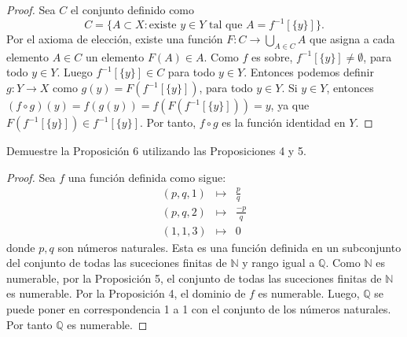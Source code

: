 \documentclass[12pt]{article}
\newcommand{\N}{\mathbb{N}}
\newcommand{\Q}{\mathbb{Q}}
\newenvironment{problem}[2][Problema]{\begin{trivlist}
\item[\hskip \labelsep {\bfseries #1}\hskip \labelsep {\bfseries #2.}]}{\end{trivlist}}
\begin{document}
\begin{proof}
Sea $C$ el conjunto definido como $$C = \{A \subset X: \text{existe } y \in Y \text{ tal que } A = f^{-1}[\{y\}] \}. $$
Por el axioma de elección, existe una función $F: C \rightarrow \bigcup_{A \in C} A$ que asigna a cada elemento $A \in C$ un elemento $F(A) \in A$. Como $f$ es sobre, $f^{-1}[\{y\}] \neq \emptyset$, para todo $y \in Y$. Luego  $f^{-1}[\{y\}]\in C$ para todo $y \in Y$. Entonces podemos definir $g: Y \rightarrow X$ como $g(y) = F(f^{-1}[\{y\}]) $, para todo $y \in Y.$ Si $y \in Y$, entonces $(f \circ g)(y) = f(g(y)) = f(F(f^{-1}[\{y\}])) = y $, ya que $F(f^{-1}[\{y\}]) \in f^{-1}[\{y\}]$. Por tanto, $f \circ g$ es la función identidad en $Y$.
\end{proof}
\text{ }

\begin{problem}{22} Demuestre la Proposición 6 utilizando las Proposiciones 4 y 5.

\end{problem}
\begin{proof}
Sea $f$ una función definida como sigue: 
\begin{eqnarray*}
(p, q, 1) & \longmapsto & \frac{p}{q}\\	
(p, q, 2) & \longmapsto & \frac{-p}{q}\\	
(1, 1, 3) & \longmapsto & 0
\end{eqnarray*}
donde $p, q$ son números naturales.
Esta es una función definida en un subconjunto del conjunto de todas las suceciones finitas de $\N$ y rango igual a $\Q$. Como $\N$ es numerable,  por la Proposición 5, el conjunto de todas las suceciones finitas de $\N$ es numerable. Por la Proposición 4, el dominio de $f$ es numerable. Luego, $\Q$ se puede poner en correspondencia 1 a 1 con el conjunto de los números naturales. Por tanto $\Q$ es numerable.
\end{proof}
\end{document}
